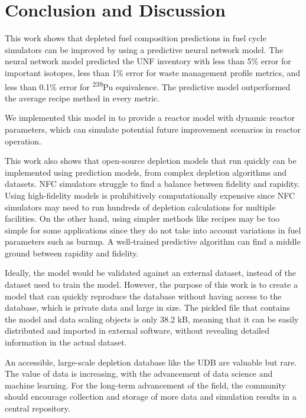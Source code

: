 \section{Conclusion and Discussion}

This work shows that depleted fuel composition predictions
in fuel cycle simulators can be improved
by using a predictive neural network  model.
The neural network model predicted the \gls{UNF} inventory
with less than 5\% error for important isotopes,
less than 1\% error for waste management profile metrics, 
and less than 0.1\% error for \textsuperscript{239}Pu equivalence.
The predictive model outperformed the average recipe
method in every metric.

We implemented this model in \Cyclus to provide a
 reactor model with dynamic reactor parameters,
which can simulate potential future improvement scenarios
in reactor operation.

This work also shows that open-source depletion models
that run quickly
can be implemented using prediction models, from
complex depletion algorithms and
datasets. \gls{NFC} simulators struggle to find a balance
between fidelity and rapidity. Using high-fidelity
models is prohibitively computationally expensive
since \gls{NFC} simulators may need to run
hundreds of depletion calculations for multiple
facilities. On the other hand, using simpler methods
like recipes may be too simple for some applications
since they do not take into account variations in fuel
parameters such as burnup.
A well-trained predictive algorithm can find a middle
ground between rapidity and fidelity.

Ideally, the model would be validated against an external
dataset, instead of the dataset used to train the model.
 However, the purpose
of this work is to create a model that can quickly reproduce the
database without having access to the database, which is private
data
and large in size. The pickled file that contains
the model and data scaling objects is only 38.2 kB, meaning that it
can be easily distributed and imported in external software, without
revealing detailed information in the actual dataset.

An accessible, large-scale depletion database 
like the \gls{UDB} are valuable
but rare. The value of data is increasing,
with the advancement of data science and machine learning.
For the long-term advancement of the field, the
community should encourage collection and storage of more
data and simulation results in
a central repository.

